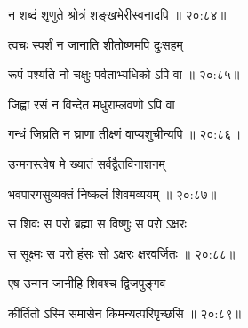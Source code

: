 
{\devanagarifont न शब्दं शृणुते श्रोत्रं शङ्खभेरीस्वनादपि {॥ २०:८४॥} \veg\dontdisplaylinenum }%

{\devanagarifont त्वचः स्पर्शं न जानाति शीतोष्णमपि दुःसहम् \thinspace{\dandab} \dontdisplaylinenum }%
 

{\devanagarifont रूपं पश्यति नो चक्षुः पर्वताभ्यधिको ऽपि वा {॥ २०:८५॥} \veg\dontdisplaylinenum }%
 
{\devanagarifont जिह्वा रसं न विन्देत मधुराम्लवणो ऽपि वा \thinspace{\dandab} \dontdisplaylinenum }%


{\devanagarifont गन्धं जिघ्रति न घ्राणा तीक्ष्णं वाप्यशुचीन्यपि {॥ २०:८६॥} \veg\dontdisplaylinenum }%

{\devanagarifont उन्मनस्त्वेष मे ख्यातं सर्वद्वैतविनाशनम् \thinspace{\dandab} \dontdisplaylinenum }%


{\devanagarifont भवपारगसुव्यक्तं निष्कलं शिवमव्ययम् {॥ २०:८७॥} \veg\dontdisplaylinenum }%
 
{\devanagarifont स शिवः स परो ब्रह्मा स विष्णुः स परो ऽक्षरः \thinspace{\dandab} \dontdisplaylinenum }%
 

{\devanagarifont स सूक्ष्मः स परो हंसः सो ऽक्षरः क्षरवर्जितः {॥ २०:८८॥} \veg\dontdisplaylinenum }%
 
{\devanagarifont एष उन्मन जानीहि शिवश्च द्विजपुङ्गव \thinspace{\dandab} \dontdisplaylinenum }%


{\devanagarifont कीर्तितो ऽस्मि समासेन किमन्यत्परिपृच्छसि {॥ २०:८९॥} \veg\dontdisplaylinenum }%

